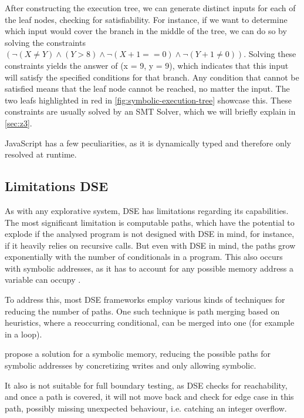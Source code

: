 After constructing the execution tree, we can generate distinct inputs for each of the leaf nodes, checking for satisfiability.
For instance, if we want to determine which input would cover the branch in the middle of the tree, we can do so by solving the constraints  $(\neg(X \neq Y) \land (Y > 8) \land \neg( X+1==0 ) \land \neg(Y+1 \neq 0 ))$. 
Solving these constraints yields the answer of (x = 9, y = 9), which indicates that this input will satisfy the specified conditions for that branch. 
Any condition that cannot be satisfied means that the leaf node cannot be reached, no matter the input. The two leafs highlighted in red in  \autoref{fig:symbolic-execution-tree} showcase this.
These constraints are usually solved by an SMT Solver, which we will briefly explain in \autoref{sec:z3}.


JavaScript has a few peculiarities, as it is dynamically typed and therefore only resolved at runtime. 

\subsection{Limitations DSE}

As with any explorative system, DSE has limitations regarding its capabilities. 
The most significant limitation is computable paths, which have the potential to explode if the analysed program is not designed with DSE in mind, for instance, if it heavily relies on recursive calls. 
But even with DSE in mind, the paths grow exponentially with the number of conditionals in a program.  \cite{cadar_symbolic_2013}
This also occurs with symbolic addresses, as it has to account for any possible memory address a variable can occupy \cite{elkarablieh_precise_2009}.  

To address this, most DSE frameworks employ various kinds of techniques for reducing the number of paths. 
One such technique is path merging based on heuristics, where a reoccurring conditional, can be merged into one (for example in a loop).\cite{kuznetsov_efficient_nodate}

\citet{cha_unleashing_2012} propose a solution for a symbolic memory, reducing the possible paths for symbolic addresses by concretizing writes and only allowing symbolic.    

It also is not suitable for full boundary testing, as DSE checks for reachability, and once a path is covered, it will not move back and check for edge case in this path, possibly missing unexpected behaviour, i.e. catching an integer overflow.\cite{berthier_efficient_2023}




